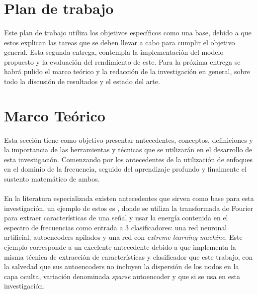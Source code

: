 \documentclass[12pt]{article}%
\begin{document}
\section{Plan de trabajo}
\paragraph{}
Este plan de trabajo utiliza los objetivos específicos como una base, debido a que estos explican las tareas que se deben llevar a cabo para cumplir el objetivo general. Esta segunda entrega, contempla la implementación del modelo propuesto y la evaluación del rendimiento de este. Para la próxima entrega se habrá pulido el marco teórico y la redacción de la investigación en general, sobre todo la discusión de resultados y el estado del arte.

\section{Marco Teórico}

\paragraph{}
Esta sección tiene como objetivo presentar antecedentes, conceptos, definiciones y la importancia de las herramientas y técnicas que se utilizarán en el desarrollo de esta investigación. Comenzando por los antecedentes de la utilización de enfoques en el dominio de la frecuencia, seguido del aprendizaje profundo y finalmente el sustento matemático de ambos.

\paragraph{}
En la literatura especializada existen antecedentes que sirven como base para esta investigación, un ejemplo de estos es \cite{mao}, donde se utiliza la transformada de Fourier para extraer características de una señal y usar la energía contenida en el espectro de frecuencias como entrada a 3 clasificadores: una red neuronal artificial, autoencoders apilados y una red con \textit{extreme learning machine}. Este ejemplo corresponde a un excelente antecedente debido a que implementa la misma técnica de extracción de características y clasificador que este trabajo, con la salvedad que sus autoencoders no incluyen la dispersión de los nodos en la capa oculta, variación denominada \textit{sparse} autoencoder y que si se usa en esta investigación.
\end{document}
